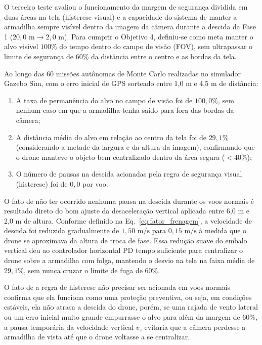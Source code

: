 
O terceiro teste avaliou o funcionamento da margem de segurança dividida em duas áreas na tela (histerese visual) e a capacidade do sistema de manter a armadilha sempre visível dentro da imagem da câmera durante a descida da Fase 1 ($20{,}0\text{ m} \to 2{,}0\text{ m}$). Para cumprir o Objetivo 4, definiu-se como meta manter o alvo visível $100\%$ do tempo dentro do campo de visão (FOV), sem ultrapassar o limite de segurança de $60\%$ da distância entre o centro e as bordas da tela.

Ao longo das 60 missões autônomas de Monte Carlo realizadas no simulador Gazebo Sim, com o erro inicial de GPS sorteado entre 1,0 m e 4,5 m de distância:
\begin{enumerate}
	\item A taxa de permanência do alvo no campo de visão foi de $100{,}0\%$, sem nenhum caso em que a armadilha tenha saído para fora das bordas da câmera;
	\item A distância média do alvo em relação ao centro da tela foi de $29{,}1\%$ (considerando a metade da largura e da altura da imagem), confirmando que o drone manteve o objeto bem centralizado dentro da área segura ($< 40\%$);
	\item O número de pausas na descida acionadas pela regra de segurança visual (histerese) foi de $0{,}0$ por voo.
\end{enumerate}


O fato de não ter ocorrido nenhuma pausa na descida durante os voos normais é resultado direto do bom ajuste da desaceleração vertical aplicada entre 6,0 m e 2,0 m de altura. Conforme definido na Eq.~\ref{eq:fator_frenagem}, a velocidade de descida foi reduzida gradualmente de $1{,}50\text{ m/s}$ para $0{,}15\text{ m/s}$ à medida que o drone se aproximava da altura de troca de fase. Essa redução suave do embalo vertical deu ao controlador horizontal PD tempo suficiente para centralizar o drone sobre a armadilha com folga, mantendo o desvio na tela na faixa média de $29{,}1\%$, sem nunca cruzar o limite de fuga de $60\%$.

O fato de a regra de histerese não precisar ser acionada em voos normais confirma que ela funciona como uma proteção preventiva, ou seja, em condições estáveis, ela não atrasa a descida do drone, porém, se uma rajada de vento lateral ou um erro inicial muito grande empurrasse o alvo para além da margem de $60\%$, a pausa temporária da velocidade vertical $v_z$ evitaria que a câmera perdesse a armadilha de vista até que o drone voltasse a se centralizar.

